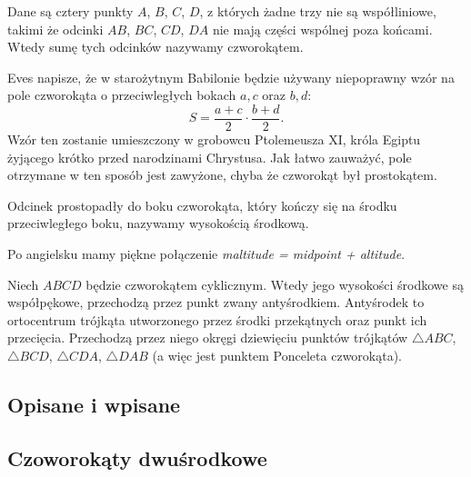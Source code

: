 %

\begin{definition}[czworokąt]
%
	Dane są cztery punkty $A$, $B$, $C$, $D$, z których żadne trzy nie są współliniowe, takimi że odcinki $AB$, $BC$, $CD$, $DA$ nie mają części wspólnej poza końcami.
    Wtedy sumę tych odcinków nazywamy czworokątem.	
\end{definition}



Eves \cite[s.4]{eves_1963} napisze, że w starożytnym Babilonie będzie używany niepoprawny wzór na pole czworokąta o przeciwległych bokach $a, c$ oraz $b, d$:
\begin{equation}
	S = \frac{a + c}{2} \cdot \frac{b + d}{2}.
\end{equation}
Wzór ten zostanie umieszczony w grobowcu Ptolemeusza XI, króla Egiptu żyjącego krótko przed narodzinami Chrystusa.
Jak łatwo zauważyć, pole otrzymane w ten sposób jest zawyżone, chyba że czworokąt był prostokątem.


\begin{definition}
	Odcinek prostopadły do boku czworokąta, który kończy się na środku przeciwległego boku, nazywamy wysokością środkową.
\end{definition}

Po angielsku mamy piękne połączenie \emph{maltitude = midpoint + altitude}.

\begin{proposition} %
	Niech $ABCD$ będzie czworokątem cyklicznym.
	Wtedy jego wysokości środkowe są współpękowe, przechodzą przez punkt zwany antyśrodkiem.
%
	Antyśrodek to ortocentrum trójkąta utworzonego przez środki przekątnych oraz punkt ich przecięcia.
	Przechodzą przez niego okręgi dziewięciu punktów trójkątów $\triangle ABC$, $\triangle BCD$, $\triangle CDA$, $\triangle DAB$ (a więc jest punktem Ponceleta czworokąta).
\end{proposition}

\subsection{Opisane i wpisane}


\subsection{Czoworokąty dwuśrodkowe}


